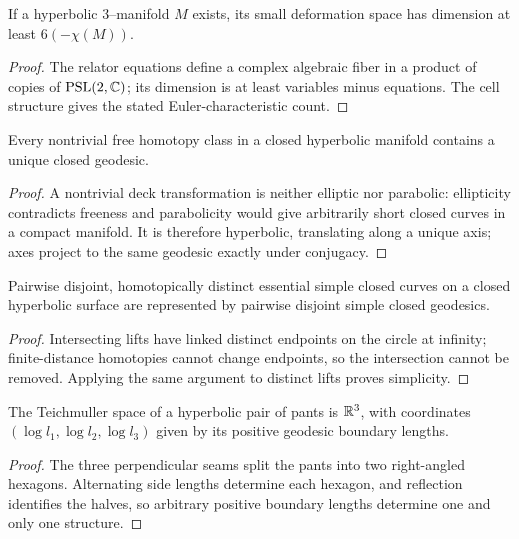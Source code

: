 \begin{proposition}
\label{thurston-ch05-three-dimensional-lower-bound}
If a hyperbolic $3$--manifold $M$ exists, its small deformation space has dimension at least $6(-\chi(M))$.
\end{proposition}
\begin{proof}\sketch The relator equations define a complex algebraic fiber in a product of copies of $\operatorname{PSL}(2,\mathbb{C})$; its dimension is at least variables minus equations.  The cell structure gives the stated Euler-characteristic count.\end{proof}

\begin{proposition}
\label{thurston-ch05-closed-geodesic-representatives}
Every nontrivial free homotopy class in a closed hyperbolic manifold contains a unique closed geodesic.
\end{proposition}
\begin{proof}\sketch A nontrivial deck transformation is neither elliptic nor parabolic: ellipticity contradicts freeness and parabolicity would give arbitrarily short closed curves in a compact manifold.  It is therefore hyperbolic, translating along a unique axis; axes project to the same geodesic exactly under conjugacy.\end{proof}

\begin{proposition}
\label{thurston-ch05-disjoint-geodesic-realization}
Pairwise disjoint, homotopically distinct essential simple closed curves on a closed hyperbolic surface are represented by pairwise disjoint simple closed geodesics.
\end{proposition}
\begin{proof}\sketch Intersecting lifts have linked distinct endpoints on the circle at infinity; finite-distance homotopies cannot change endpoints, so the intersection cannot be removed.  Applying the same argument to distinct lifts proves simplicity.\end{proof}

\begin{proposition}
\label{thurston-ch05-pants-coordinates}
The Teichmuller space of a hyperbolic pair of pants is $\mathbb{R}^3$, with coordinates $(\log l_1,\log l_2,\log l_3)$ given by its positive geodesic boundary lengths.
\end{proposition}
\begin{proof}\sketch The three perpendicular seams split the pants into two right-angled hexagons.  Alternating side lengths determine each hexagon, and reflection identifies the halves, so arbitrary positive boundary lengths determine one and only one structure.\end{proof}

